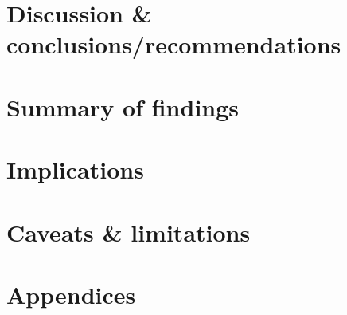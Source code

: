 \documentclass[12pt,a4paper]{article}
\begin{document}
\section{Discussion \& conclusions/recommendations}

\section{Summary of findings}

\section{Implications}

\section{Caveats \& limitations}

\section{Appendices}
\end{document}

